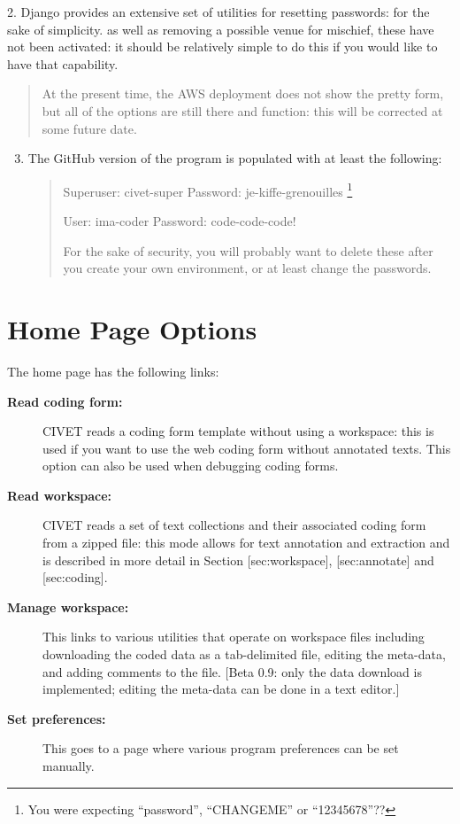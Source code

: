 \documentclass[letterpaper,10pt,english]{sphinxmanual}
\begin{document}
2. Django provides an extensive set of utilities for resetting passwords: for the sake of simplicity. as well as removing a
possible venue for mischief, these have not been activated: it should be relatively simple to do this if you would like
to have that capability.
\begin{quote}

At the present time, the AWS deployment does not show the pretty form, but all of the options are still there and
function: this will be corrected at some future date.
\end{quote}
\begin{enumerate}
\setcounter{enumi}{2}
\item {} 
The GitHub version of the program is populated with at least the following:
\begin{quote}

Superuser: civet-super  Password: je-kiffe-grenouilles \footnote{
You were expecting “password”, “CHANGEME” or “12345678”??
}

User: ima-coder  Password: code-code-code!

For the sake of security, you will probably want to delete these after you create your own environment, or at
least change the passwords.
\end{quote}

\end{enumerate}


\chapter{Home Page Options}
\label{homepage:home-page-options}\label{homepage::doc}
The home page has the following links:
\begin{description}
\item[{\textbf{Read coding form:}}] \leavevmode
CIVET reads a coding form template without using a workspace: this
is used if you want to use the web coding form without annotated
texts. This option can also be used when debugging coding forms.

\item[{\textbf{Read workspace:}}] \leavevmode
CIVET reads a set of text collections and their associated coding
form from a zipped file: this mode allows for text annotation and
extraction and is described in more detail in Section
{[}sec:workspace{]}, {[}sec:annotate{]} and {[}sec:coding{]}.

\item[{\textbf{Manage workspace:}}] \leavevmode
This links to various utilities that operate on workspace files
including downloading the coded data as a
tab-delimited file, editing the meta-data, and adding comments to
the file. {[}Beta 0.9: only the data download is implemented; editing
the meta-data can be done in a text editor.{]}

\item[{\textbf{Set preferences:}}] \leavevmode
This goes to a page where various program preferences can be set
manually.

\end{description}
\end{document}
